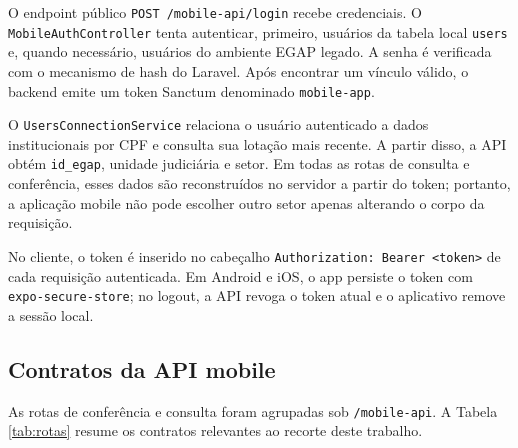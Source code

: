 \documentclass[12pt,a4paper]{article}
\begin{document}
O endpoint público \texttt{POST /mobile-api/login} recebe credenciais. O
\texttt{MobileAuthController} tenta autenticar, primeiro, usuários da tabela
local \texttt{users} e, quando necessário, usuários do ambiente EGAP legado.
A senha é verificada com o mecanismo de hash do Laravel. Após encontrar um
vínculo válido, o backend emite um token Sanctum denominado
\texttt{mobile-app}.

O \texttt{UsersConnectionService} relaciona o usuário autenticado a dados
institucionais por CPF e consulta sua lotação mais recente. A partir disso, a
API obtém \texttt{id\_egap}, unidade judiciária e setor. Em todas as rotas de
consulta e conferência, esses dados são reconstruídos no servidor a partir do
token; portanto, a aplicação mobile não pode escolher outro setor apenas
alterando o corpo da requisição.

No cliente, o token é inserido no cabeçalho
\texttt{Authorization: Bearer <token>} de cada requisição autenticada. Em
Android e iOS, o app persiste o token com \texttt{expo-secure-store}; no
logout, a API revoga o token atual e o aplicativo remove a sessão local.

\subsection{Contratos da API mobile}

As rotas de conferência e consulta foram agrupadas sob
\texttt{/mobile-api}. A Tabela \ref{tab:rotas} resume os contratos relevantes
ao recorte deste trabalho.
\end{document}
